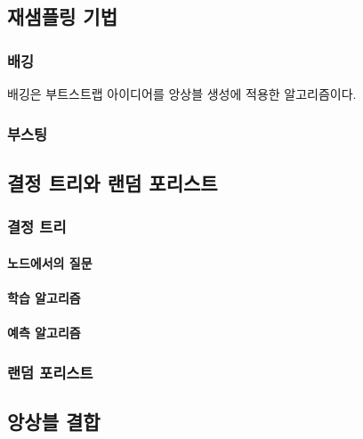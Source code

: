 \documentclass [12pt] {oblivoir}
\let\oldsubsubsection=\subsubsection
\renewcommand{\subsubsection}
{
  \filbreak
  \oldsubsubsection
}
\begin{document}
\subsection{재샘플링 기법}

\subsubsection{배깅}

배깅은 부트스트랩 아이디어를 앙상블 생성에 적용한 알고리즘이다.

\subsubsection{부스팅}

\subsection{결정 트리와 랜덤 포리스트}

\subsubsection{결정 트리}

\paragraph*{노드에서의 질문}\mbox{}

\vspace{3mm}

\paragraph*{학습 알고리즘}\mbox{}

\vspace{3mm}

\paragraph*{예측 알고리즘}\mbox{}

\vspace{3mm}

\subsubsection{랜덤 포리스트}

\subsection{앙상블 결합}
\end{document}
